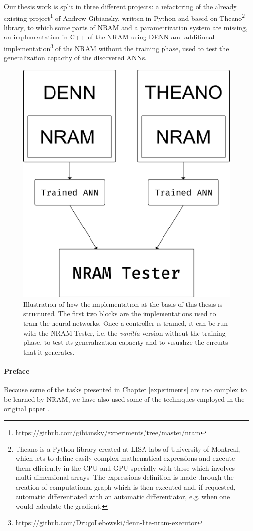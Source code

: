 \label{chap:implementation}
Our thesis work is split in three different projects: a refactoring of the already existing project\footnote{\hyperref[https://github.com/gibiansky/experiments/tree/master/nram]{https://github.com/gibiansky/experiments/tree/master/nram}} of Andrew Gibiansky, written in Python and based on Theano\footnote{Theano is a Python library created at LISA labs of University of Montreal, which lets to define easily complex mathematical expressions and execute them efficiently in the CPU and GPU specially with those which involves multi-dimensional arrays. The expressions definition is made through the creation of computational graph which is then executed and, if requested, automatic differentiated with an automatic differentiator, e.g. when one would calculate the gradient.} library, to which some parts of NRAM and a parametrization system are missing, an implementation in C++ of the NRAM using DENN and additional implementation\footnote{\hyperref[https://github.com/DrugoLebowski/denn-lite-nram-executor]{https://github.com/DrugoLebowski/denn-lite-nram-executor}} of the NRAM without the training phase, used to test the generalization capacity of the discovered ANNs.
\begin{figure}[h]
	\centering
	\includegraphics[width=0.5\linewidth]{figures/NRAM-implementation.png}
	\caption{Illustration of how the implementation at the basis of this thesis is structured. The first two blocks are the implementations used to train the neural networks. Once a controller is trained, it can be run with the NRAM Tester, i.e. the \textit{vanilla} version without the training phase, to test its generalization capacity and to visualize the circuits that it generates.}
	\label{fig:nram-implementation-scheme}
\end{figure}

\paragraph{Preface}
Because some of the tasks presented in Chapter \ref{experiments} are too complex to be learned by NRAM, we have also used some of the techniques employed in the original paper \cite{NRAM:2016}.

